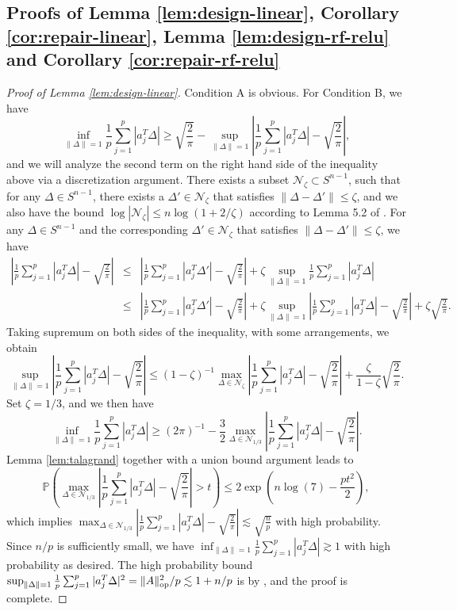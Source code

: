 \subsection{Proofs of Lemma \ref{lem:design-linear}, Corollary \ref{cor:repair-linear}, Lemma \ref{lem:design-rf-relu} and Corollary \ref{cor:repair-rf-relu}}


\begin{proof}[Proof of Lemma \ref{lem:design-linear}]
Condition A is obvious. For Condition B, we have
$$
\inf_{\|\Delta\|=1}\frac{1}{p}\sum_{j=1}^p|a_j^T\Delta| \geq \sqrt{\frac{2}{\pi}} - \sup_{\|\Delta\|=1}\left|\frac{1}{p}\sum_{j=1}^p|a_j^T\Delta| - \sqrt{\frac{2}{\pi}} \right|,
$$
and we will analyze the second term on the right hand side of the inequality above via a discretization argument. There exists a subset $\mathcal{N}_{\zeta}\subset S^{n-1}$, such that for any $\Delta\in S^{n-1}$, there exists a $\Delta'\in\mathcal{N}_{\zeta}$ that satisfies $\|\Delta-\Delta'\|\leq\zeta$, and we also have the bound $\log|\mathcal{N}_{\zeta}|\leq n\log\left(1+2/\zeta\right)$ according to Lemma 5.2 of \cite{vershynin2010introduction}. For any $\Delta\in S^{n-1}$ and the corresponding $\Delta'\in\mathcal{N}_{\zeta}$ that satisfies $\|\Delta-\Delta'\|\leq \zeta$, we have
\begin{eqnarray*}
\left|\frac{1}{p}\sum_{j=1}^p|a_j^T\Delta| - \sqrt{\frac{2}{\pi}} \right| &\leq& \left|\frac{1}{p}\sum_{j=1}^p|a_j^T\Delta'| - \sqrt{\frac{2}{\pi}} \right|  + \zeta\sup_{\|\Delta\|=1}\frac{1}{p}\sum_{j=1}^p|a_j^T\Delta| \\
&\leq& \left|\frac{1}{p}\sum_{j=1}^p|a_j^T\Delta'| - \sqrt{\frac{2}{\pi}} \right| + \zeta\sup_{\|\Delta\|=1}\left|\frac{1}{p}\sum_{j=1}^p|a_j^T\Delta| - \sqrt{\frac{2}{\pi}} \right| + \zeta\sqrt{\frac{2}{\pi}}.
\end{eqnarray*}
Taking supremum on both sides of the inequality, with some arrangements, we obtain
$$\sup_{\|\Delta\|=1}\left|\frac{1}{p}\sum_{j=1}^p|a_j^T\Delta| - \sqrt{\frac{2}{\pi}} \right|\leq (1-\zeta)^{-1}\max_{\Delta\in\mathcal{N}_{\zeta}}\left|\frac{1}{p}\sum_{j=1}^p|a_j^T\Delta| - \sqrt{\frac{2}{\pi}} \right| + \frac{\zeta}{1-\zeta}\sqrt{\frac{2}{\pi}}.$$
Set $\zeta=1/3$, and we then have
$$\inf_{\|\Delta\|=1}\frac{1}{p}\sum_{j=1}^p|a_j^T\Delta| \geq (2\pi)^{-1} - \frac{3}{2}\max_{\Delta\in\mathcal{N}_{1/3}}\left|\frac{1}{p}\sum_{j=1}^p|a_j^T\Delta| - \sqrt{\frac{2}{\pi}} \right|.$$
Lemma \ref{lem:talagrand} together with a union bound argument leads to
$$\mathbb{P}\left(\max_{\Delta\in\mathcal{N}_{1/3}}\left|\frac{1}{p}\sum_{j=1}^p|a_j^T\Delta| - \sqrt{\frac{2}{\pi}} \right|>t\right)\leq 2\exp\left(n\log(7)-\frac{pt^2}{2}\right),$$
which implies $\max_{\Delta\in\mathcal{N}_{1/3}}\left|\frac{1}{p}\sum_{j=1}^p|a_j^T\Delta| - \sqrt{\frac{2}{\pi}} \right|\lesssim \sqrt{\frac{n}{p}}$ with high probability. Since $n/p$ is sufficiently small, we have $\inf_{\|\Delta\|=1}\frac{1}{p}\sum_{j=1}^p|a_j^T\Delta|\gtrsim 1$ with high probability as desired. The high probability bound $\sup_{\|\Delta\|=1}\frac{1}{p}\sum_{j=1}^p|a_j^T\Delta|^2=\|A\|_{\rm op}^2/p\lesssim 1+n/p$ is by \cite{davidson2001local}, and the proof is complete.
\end{proof}

